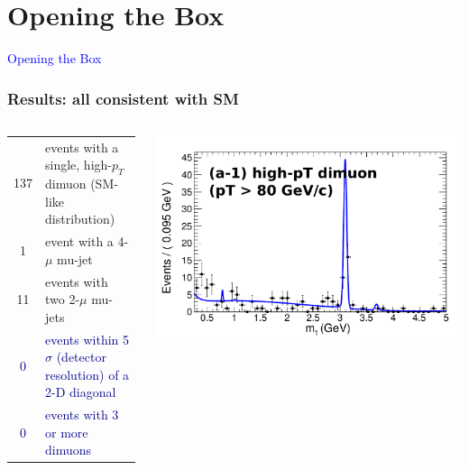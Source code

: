 \documentclass[compress]{beamer}
\begin{document}
\section*{Opening the Box}
\begin{frame}

\vfill
\begin{center}
\Huge \textcolor{blue}{Opening the Box}
\end{center}

\vfill
\end{frame}

\begin{frame}
\frametitle{Results: all consistent with SM}

\begin{columns}
\begin{tabular}{c p{0.85\linewidth}}
137 & events with a single, high-$p_T$ dimuon (SM-like distribution) \\
1 & event with a 4-$\mu$ mu-jet \\
11 & events with two 2-$\mu$ mu-jets \\
\textcolor{darkblue}{0} & \textcolor{darkblue}{events within 5$\sigma$ (detector \mbox{resolution}) of a 2-D diagonal} \\
\textcolor{darkblue}{0} & \textcolor{darkblue}{events with 3 or more dimuons}
\end{tabular}

\includegraphics[width=\linewidth]{signal_a1_data-bkgpdf.pdf}
\end{columns}


\end{frame}
\end{document}
